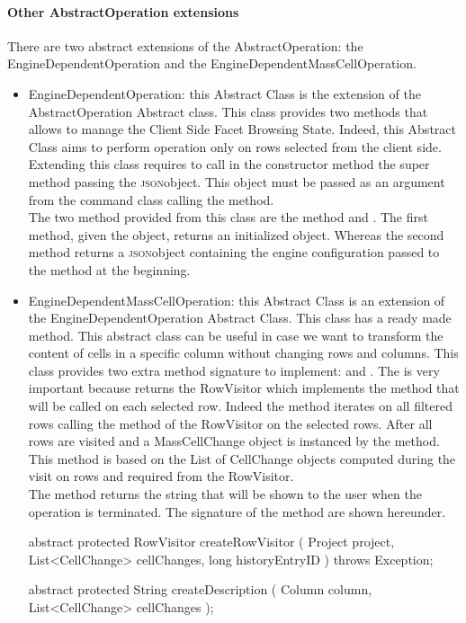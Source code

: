 \paragraph{Other AbstractOperation extensions} There are two abstract extensions of the AbstractOperation: the EngineDependentOperation and the EngineDependentMassCellOperation.
\begin{itemize}
	\item \textsf{EngineDependentOperation}: this Abstract Class is the extension of the AbstractOperation Abstract class. This class provides two methods that allows to manage the Client Side Facet Browsing State. Indeed, this Abstract Class aims to perform operation only on rows selected from the client side. Extending this class requires to call in the constructor method the super method passing the  \textsc{json}object. This object must be passed as an argument from the command class calling the  method.\\
The two method provided from this class are the  method and . The first method, given the  object, returns an initialized  object. Whereas the second method returns a \textsc{json}object containing the engine configuration passed to the  method at the beginning.
	\item \textsf{EngineDependentMassCellOperation}: this Abstract Class is an extension of the EngineDependentOperation Abstract Class. This class has a ready made  method. This abstract class can be useful in case we want to transform the content of cells in a specific column without changing rows and columns. This class provides two extra method signature to implement:  and . The  is very important because returns the RowVisitor which implements the  method that will be called on each selected row. Indeed the  method iterates on all filtered rows calling the method  of the RowVisitor on the selected rows. After all rows are visited and a MassCellChange object is instanced by the  method. This method is based on the List of CellChange objects computed during the visit on rows and required from the RowVisitor. \\
	The  method returns the string that will be shown to the user when the operation is terminated. The signature of the method are shown hereunder.
	\begin{code}
abstract protected RowVisitor createRowVisitor (
      Project project,
      List<CellChange> cellChanges,
      long historyEntryID ) throws Exception;
     
abstract protected String createDescription (
      Column column,
      List<CellChange> cellChanges );
	\end{code}
\end{itemize}

